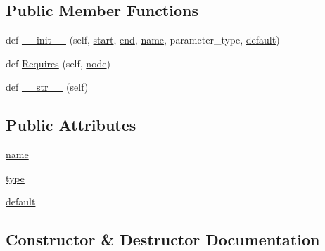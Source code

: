 \subsection*{Public Member Functions}
\begin{DoxyCompactItemize}
\item 
def \hyperlink{classcpp_1_1ast_1_1Parameter_a4fe27f559d44adac9e9b5898ba76c5b3}{\+\_\+\+\_\+init\+\_\+\+\_\+} (self, \hyperlink{classcpp_1_1ast_1_1Node_a7b2aa97e6a049bb1a93aea48c48f1f44}{start}, \hyperlink{classcpp_1_1ast_1_1Node_a3c5e5246ccf619df28eca02e29d69647}{end}, \hyperlink{classcpp_1_1ast_1_1Parameter_aae0375fb0ded8fa9090feea6bdff2784}{name}, parameter\+\_\+type, \hyperlink{classcpp_1_1ast_1_1Parameter_a4ceae2ac87d82c5542c4e7385eb4c97e}{default})
\item 
def \hyperlink{classcpp_1_1ast_1_1Parameter_a4bc5c17a0d606d35be40cb4c2c1a67a6}{Requires} (self, \hyperlink{classnode}{node})
\item 
def \hyperlink{classcpp_1_1ast_1_1Parameter_aabfbabb3c744a0da4a012ceb4299947a}{\+\_\+\+\_\+str\+\_\+\+\_\+} (self)
\end{DoxyCompactItemize}
\subsection*{Public Attributes}
\begin{DoxyCompactItemize}
\item 
\hyperlink{classcpp_1_1ast_1_1Parameter_aae0375fb0ded8fa9090feea6bdff2784}{name}
\item 
\hyperlink{classcpp_1_1ast_1_1Parameter_a5eed090000c41551a10c21f175ad33e3}{type}
\item 
\hyperlink{classcpp_1_1ast_1_1Parameter_a4ceae2ac87d82c5542c4e7385eb4c97e}{default}
\end{DoxyCompactItemize}


\subsection{Constructor \& Destructor Documentation}
